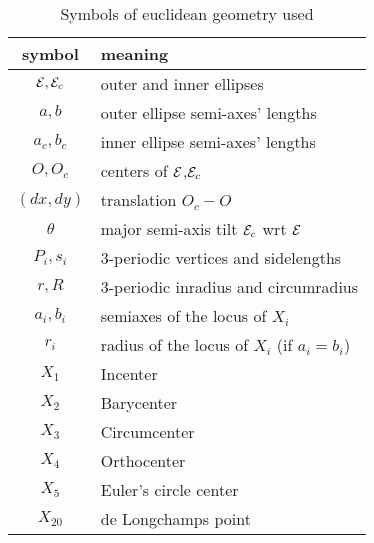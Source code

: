 \begin{table}
\begin{tabular}{|c|l|}
\hline
symbol & meaning \\
\hline
$\mathcal{E},\mathcal{E}_c$ & outer and inner ellipses \\
$a,b$ & outer ellipse semi-axes' lengths \\
$a_c,b_c$ & inner ellipse semi-axes' lengths \\
$O,O_c$ & centers of $\mathcal{E}$,$\mathcal{E}_c$ \\
$(dx,dy)$ & translation $O_c-O$ \\
$\theta$ & major semi-axis tilt $\mathcal{E}_c$ wrt $\mathcal{E}$ \\
$P_i,s_i$ & 3-periodic vertices and sidelengths \\
$r,R$ & 3-periodic inradius and circumradius \\
$a_i,b_i$ & semiaxes of the locus of $X_i$ \\
$r_i$ & radius of the locus of $X_i$ (if $a_i=b_i$) \\
\hline
$X_1$ & Incenter \\
$X_2$ & Barycenter \\
$X_3$ & Circumcenter \\
$X_4$ & Orthocenter \\
$X_5$ & Euler's circle center \\
$X_{20}$ & de Longchamps point \\
\hline
\end{tabular}
\caption{Symbols of euclidean geometry used}
\label{tab:symbols}
\end{table}